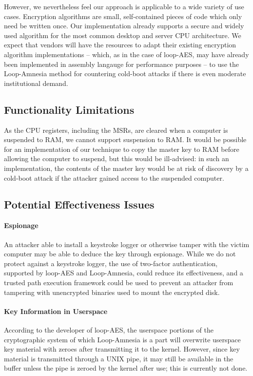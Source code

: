 \documentclass[letterpaper,twocolumn,nonatbib,10pt]{article}
\begin{document}
However, we nevertheless feel our approach is applicable to a wide
variety of use cases.  Encryption algorithms are small, self-contained
pieces of code which only need be written once.  Our implementation
already supports a secure and widely used algorithm for the most
common desktop and server CPU architecture.  We expect that vendors
will have the resources to adapt their existing encryption algorithm
implementations -- which, as in the case of loop-AES, may have already
been implemented in assembly langauge for performance purposes -- to
use the Loop-Amnesia method for countering cold-boot attacks if there
is even moderate institutional demand.

\subsection{Functionality Limitations}

As the CPU registers, including the MSRs, are cleared when a computer
is suspended to RAM, we cannot support suspension to RAM.  It would be
possible for an implementation of our technique to copy the master key
to RAM before allowing the computer to suspend, but this would be
ill-advised: in such an implementation, the contents of the master key
would be at risk of discovery by a cold-boot attack if the attacker
gained access to the suspended computer.

\subsection{Potential Effectiveness Issues}

\paragraph{Espionage}
An attacker able to install a keystroke logger or otherwise tamper
with the victim computer may be able to deduce the key through
espionage.  While we do not protect against a keystroke logger, the
use of two-factor authentication, supported by loop-AES and
Loop-Amnesia, could reduce its effectiveness, and a trusted
path\cite{tpmfoolery} execution framework could be used to prevent an
attacker from tampering with unencrypted binaries used to mount the
encrypted disk.

\paragraph{Key Information in Userspace}
According to the developer of loop-AES, the userspace portions of the
cryptographic system of which Loop-Amnesia is a part will overwrite
userspace key material with zeroes after transmitting it to the
kernel\cite{ruusumail}.  However, since key material is transmitted
through a UNIX pipe, it may still be available in the buffer unless
the pipe is zeroed by the kernel after use; this is currently not
done.
\end{document}
